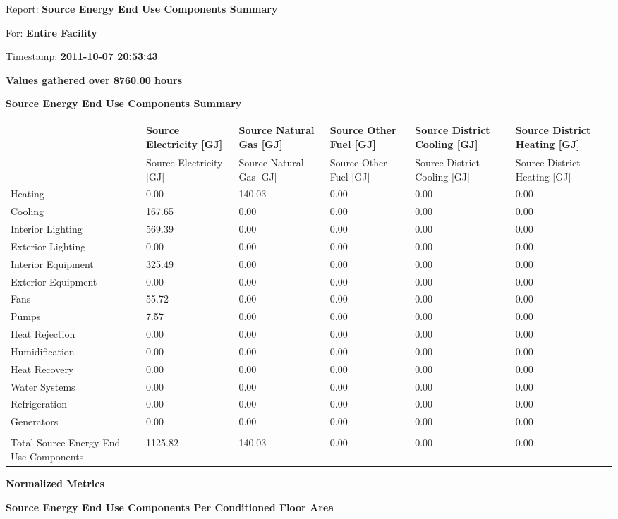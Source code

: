 Report: \textbf{Source Energy End Use Components Summary}

For: \textbf{Entire Facility}

Timestamp: \textbf{2011-10-07 20:53:43}

\textbf{Values gathered over 8760.00 hours}

\textbf{Source Energy End Use Components Summary}

\begin{longtable}[c]{>{\raggedright}p{1.0in}>{\raggedright}p{1.0in}>{\raggedright}p{1.0in}>{\raggedright}p{1.0in}>{\raggedright}p{1.0in}>{\raggedright}p{1.0in}}
\toprule 
 & Source Electricity [GJ] & Source Natural Gas [GJ] & Source Other Fuel [GJ] & Source District Cooling [GJ] & Source District Heating [GJ] \tabularnewline
\midrule
\endfirsthead

\toprule 
 & Source Electricity [GJ] & Source Natural Gas [GJ] & Source Other Fuel [GJ] & Source District Cooling [GJ] & Source District Heating [GJ] \tabularnewline
\midrule
\endhead

Heating & 0.00 & 140.03 & 0.00 & 0.00 & 0.00 \tabularnewline
Cooling & 167.65 & 0.00 & 0.00 & 0.00 & 0.00 \tabularnewline
Interior Lighting & 569.39 & 0.00 & 0.00 & 0.00 & 0.00 \tabularnewline
Exterior Lighting & 0.00 & 0.00 & 0.00 & 0.00 & 0.00 \tabularnewline
Interior Equipment & 325.49 & 0.00 & 0.00 & 0.00 & 0.00 \tabularnewline
Exterior Equipment & 0.00 & 0.00 & 0.00 & 0.00 & 0.00 \tabularnewline
Fans & 55.72 & 0.00 & 0.00 & 0.00 & 0.00 \tabularnewline
Pumps & 7.57 & 0.00 & 0.00 & 0.00 & 0.00 \tabularnewline
Heat Rejection & 0.00 & 0.00 & 0.00 & 0.00 & 0.00 \tabularnewline
Humidification & 0.00 & 0.00 & 0.00 & 0.00 & 0.00 \tabularnewline
Heat Recovery & 0.00 & 0.00 & 0.00 & 0.00 & 0.00 \tabularnewline
Water Systems & 0.00 & 0.00 & 0.00 & 0.00 & 0.00 \tabularnewline
Refrigeration & 0.00 & 0.00 & 0.00 & 0.00 & 0.00 \tabularnewline
Generators & 0.00 & 0.00 & 0.00 & 0.00 & 0.00 \tabularnewline
 &  &  &  &  &  \tabularnewline
Total Source Energy End Use Components & 1125.82 & 140.03 & 0.00 & 0.00 & 0.00 \tabularnewline
\bottomrule
\end{longtable}

\textbf{Normalized Metrics}

\textbf{Source Energy End Use Components Per Conditioned Floor Area}

